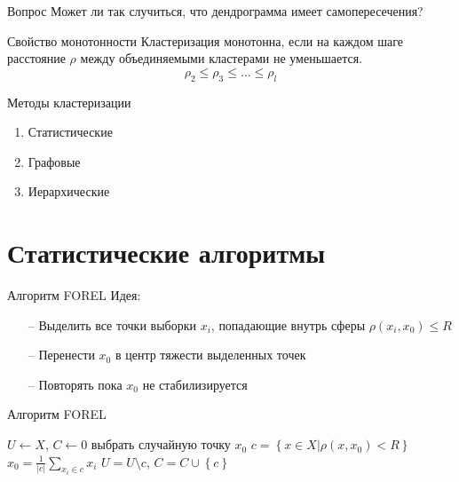 \documentclass[10pt]{beamer}
\begin{document}
\begin{frame}{Вопрос}
  \centering  
  Может ли так случиться, что дендрограмма имеет самопересечения?
\end{frame}

\begin{frame}{Свойство монотонности}
  Кластеризация монотонна, если на каждом шаге расстояние $\rho$ между объединяемыми кластерами не уменьшается.\\
  \bigbreak  
  $$\rho_2 \leq \rho_3 \leq \dots \leq \rho_l$$
\end{frame}

\begin{frame}{Методы кластеризации}
	\begin{enumerate} [-]
    \item Статистические 				
		\item Графовые 
		\item Иерархические
	\end{enumerate}
\end{frame}

\section{Статистические алгоритмы}

\begin{frame}{Алгоритм FOREL}
  \alert{Идея}:\\
	\begin{itemize}
		\item[--] Выделить все точки выборки $x_i$, попадающие внутрь сферы $\rho(x_i, x_0) \leq R$
		\item[--] Перенести $x_0$ в центр тяжести выделенных точек
		\item[--] Повторять пока $x_0$ не стабилизируется
	\end{itemize}
\end{frame}

\begin{frame}{Алгоритм FOREL}
	\begin{algorithmic}[1]
            \State ${U \gets X}$, $C \gets 0$
                \State выбрать случайную точку $x_0$
                		\State ${c = \left\{ x \in X \vert \rho(x, x_0) < R \right\}}$
                		\State $x_0 = \frac{1}{\vert c \vert} \sum\limits_{x_i \in c} x_i$
                	\EndRepeat
    		        \State ${U = U \setminus c}$, ${C = C \cup \left\{ c \right\}}$
            \EndWhile            
        \EndFunction
    \end{algorithmic}
\end{frame}
\end{document}
